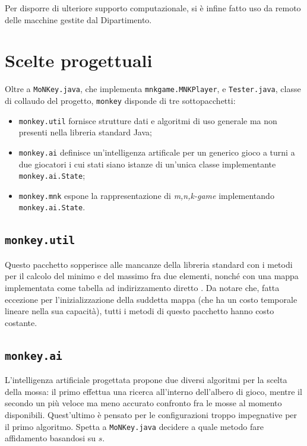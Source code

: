 \documentclass{article}
\begin{document}
Per disporre di ulteriore supporto computazionale, si è infine fatto uso da
remoto delle macchine gestite dal Dipartimento.

\section{Scelte progettuali}

Oltre a \verb!MoNKey.java!, che implementa \verb!mnkgame.MNKPlayer!, e
\verb!Tester.java!, classe di collaudo del progetto, \verb!monkey! disponde di
tre sottopacchetti:
\begin{itemize}
  \item \verb!monkey.util! fornisce strutture dati e algoritmi di uso generale
    ma non presenti nella libreria standard Java;
  \item \verb!monkey.ai! definisce un'intelligenza artificale per un generico
    gioco a turni a due giocatori i cui stati siano istanze di un'unica classe
    implementante \verb!monkey.ai.State!;
  \item \verb!monkey.mnk! espone la rappresentazione di \emph{m,n,k-game}
    implementando \verb!monkey.ai.State!.
\end{itemize}

\subsection{\texttt{monkey.util}}

\begin{sloppypar}
Questo pacchetto sopperisce alle mancanze della libreria standard con i metodi
per il calcolo del minimo e del massimo fra due elementi, nonché con una mappa
implementata come tabella ad indirizzamento diretto
\cite{at.UBO708344820100101}. Da notare che, fatta eccezione per
l'inizializzazione della suddetta mappa (che ha un costo temporale lineare nella
sua capacità), tutti i metodi di questo pacchetto hanno costo costante.
\end{sloppypar}

\subsection{\texttt{monkey.ai}}

L'intelligenza artificiale progettata propone due diversi algoritmi per la
scelta della mossa: il primo effettua una ricerca all'interno dell'albero di
gioco, mentre il secondo un più veloce ma meno accurato confronto fra le mosse
al momento disponibili. Quest'ultimo è pensato per le configurazioni troppo
impegnative per il primo algoritmo. Spetta a \verb!MoNKey.java! decidere a quale
metodo fare affidamento basandosi su $s$.
\end{document}

